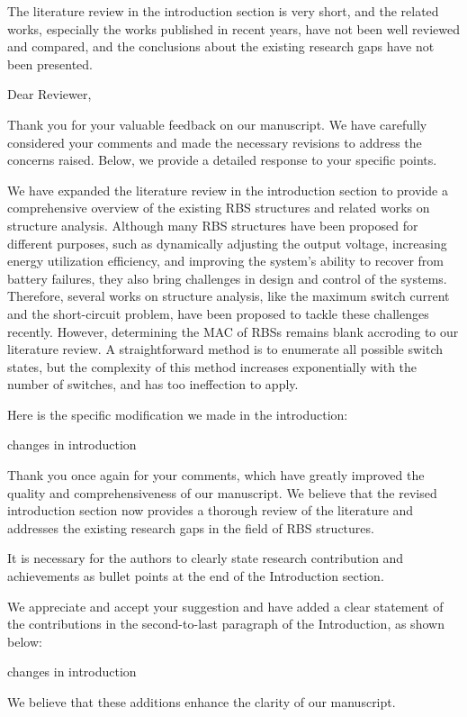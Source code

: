 \documentclass[12pt,american]{scrartcl}
\begin{document}
\begin{revcomment}
  The literature review in the introduction section is very short, and the related works, especially the works published in recent years, have not been well reviewed and compared, and the conclusions about the existing research gaps have not been presented.
\end{revcomment}
\begin{revresponse}

Dear Reviewer,

Thank you for your valuable feedback on our manuscript. We have carefully considered your comments and made the necessary revisions to address the concerns raised. Below, we provide a detailed response to your specific points.


We have expanded the literature review in the introduction section to provide a comprehensive overview of the existing RBS structures and related works on structure analysis. 
Although many RBS structures have been proposed for different purposes, such as dynamically adjusting the output voltage, increasing energy utilization efficiency, and improving the system's ability to recover from battery failures, they also bring challenges in design and control of the systems.
Therefore, several works on structure analysis, like the maximum switch current and the short-circuit problem, have been proposed to tackle these challenges recently.
However, determining the MAC of RBSs remains blank accroding to our literature review.
A straightforward method is to enumerate all possible switch states, but the complexity of this method increases exponentially with the number of switches, and has too ineffection to apply.


Here is the specific modification we made in the introduction:
\begin{changes}
  changes in introduction
\end{changes}

  
Thank you once again for your comments, which have greatly improved the quality and comprehensiveness of our manuscript. We believe that the revised introduction section now provides a thorough review of the literature and addresses the existing research gaps in the field of RBS structures.
  
\end{revresponse}

\begin{revcomment}
  It is necessary for the authors to clearly state research contribution and achievements as bullet points at the end of the Introduction section.
\end{revcomment}
\begin{revresponse}

We appreciate and accept your suggestion and have added a clear statement of the contributions in the second-to-last paragraph of the Introduction, as shown below:
\begin{changes}
  changes in introduction
\end{changes}


We believe that these additions enhance the clarity of our manuscript. 

\end{revresponse}
\end{document}
